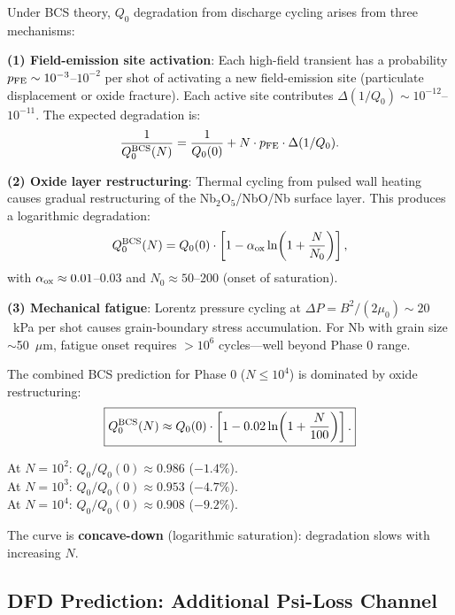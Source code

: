 \documentclass[11pt]{article}
\newcommand{\Qzero}{Q_0}
\begin{document}
Under BCS theory, $\Qzero$ degradation from discharge cycling arises
from three mechanisms:

\textbf{(1) Field-emission site activation}: Each high-field transient
has a probability $p_{\rm FE} \sim 10^{-3}$--$10^{-2}$ per shot of
activating a new field-emission site (particulate displacement or
oxide fracture). Each active site contributes $\Delta(1/\Qzero) \sim
10^{-12}$--$10^{-11}$. The expected degradation is:
\begin{equation}
\frac{1}{\Qzero^{\rm BCS}(N)} = \frac{1}{\Qzero(0)}
+ N \cdot p_{\rm FE} \cdot \Delta(1/\Qzero).
\label{eq:bcs-fe}
\end{equation}

\textbf{(2) Oxide layer restructuring}: Thermal cycling from pulsed
wall heating causes gradual restructuring of the Nb$_2$O$_5$/NbO/Nb
surface layer. This produces a logarithmic degradation:
\begin{equation}
\Qzero^{\rm BCS}(N) = \Qzero(0) \cdot
\left[1 - \alpha_{\rm ox} \ln\!\left(1 + \frac{N}{N_0}\right)\right],
\label{eq:bcs-oxide}
\end{equation}
with $\alpha_{\rm ox} \approx 0.01$--$0.03$ and $N_0 \approx 50$--200
(onset of saturation).

\textbf{(3) Mechanical fatigue}: Lorentz pressure cycling at
$\Delta P = B^2/(2\mu_0) \sim 20$~kPa per shot causes grain-boundary
stress accumulation. For Nb with grain size $\sim$50~$\mu$m, fatigue
onset requires $> 10^6$ cycles---well beyond Phase 0 range.

The combined BCS prediction for Phase 0 ($N \leq 10^4$) is dominated
by oxide restructuring:
\begin{equation}
\boxed{
\Qzero^{\rm BCS}(N) \approx \Qzero(0) \cdot
\left[1 - 0.02 \ln\!\left(1 + \frac{N}{100}\right)\right].
}
\label{eq:bcs-combined}
\end{equation}

At $N = 10^2$: $\Qzero/\Qzero(0) \approx 0.986$ ($-1.4\%$).\\
At $N = 10^3$: $\Qzero/\Qzero(0) \approx 0.953$ ($-4.7\%$).\\
At $N = 10^4$: $\Qzero/\Qzero(0) \approx 0.908$ ($-9.2\%$).

The curve is \textbf{concave-down} (logarithmic saturation):
degradation slows with increasing $N$.

\subsection{DFD Prediction: Additional Psi-Loss Channel}
\end{document}

